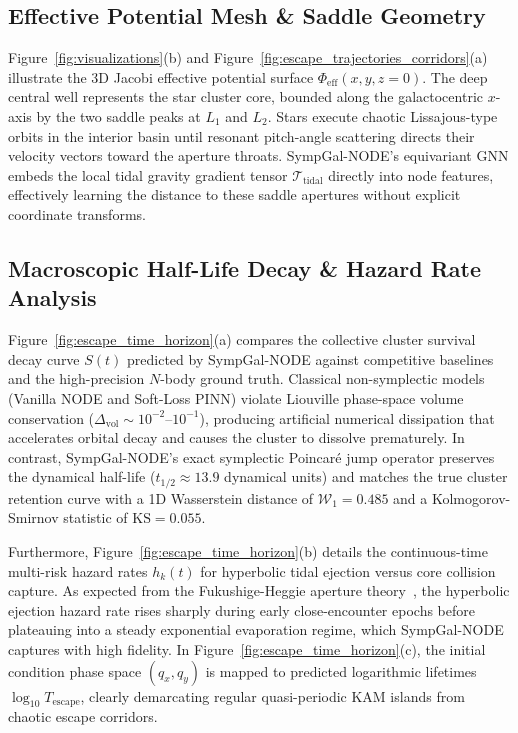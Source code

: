 \documentclass[preprint,12pt,3p]{elsarticle}
\begin{document}
\subsection{Effective Potential Mesh \& Saddle Geometry}
Figure~\ref{fig:visualizations}(b) and Figure~\ref{fig:escape_trajectories_corridors}(a) illustrate the 3D Jacobi effective potential surface $\Phi_{\mathrm{eff}}(x, y, z=0)$. The deep central well represents the star cluster core, bounded along the galactocentric $x$-axis by the two saddle peaks at $L_1$ and $L_2$. Stars execute chaotic Lissajous-type orbits in the interior basin until resonant pitch-angle scattering directs their velocity vectors toward the aperture throats. SympGal-NODE's equivariant GNN embeds the local tidal gravity gradient tensor $\bm{\mathcal{T}}_{\mathrm{tidal}}$ directly into node features, effectively learning the distance to these saddle apertures without explicit coordinate transforms.

\subsection{Macroscopic Half-Life Decay \& Hazard Rate Analysis}
Figure~\ref{fig:escape_time_horizon}(a) compares the collective cluster survival decay curve $S(t)$ predicted by SympGal-NODE against competitive baselines and the high-precision $N$-body ground truth. Classical non-symplectic models (Vanilla NODE and Soft-Loss PINN) violate Liouville phase-space volume conservation ($\Delta_{\mathrm{vol}} \sim 10^{-2}$--$10^{-1}$), producing artificial numerical dissipation that accelerates orbital decay and causes the cluster to dissolve prematurely. In contrast, SympGal-NODE's exact symplectic Poincaré jump operator preserves the dynamical half-life ($t_{1/2} \approx 13.9$ dynamical units) and matches the true cluster retention curve with a 1D Wasserstein distance of $\mathcal{W}_1 = 0.485$ and a Kolmogorov-Smirnov statistic of $\mathrm{KS} = 0.055$. 

Furthermore, Figure~\ref{fig:escape_time_horizon}(b) details the continuous-time multi-risk hazard rates $h_k(t)$ for hyperbolic tidal ejection versus core collision capture. As expected from the Fukushige-Heggie aperture theory~\cite{fukushige2000timescale}, the hyperbolic ejection hazard rate rises sharply during early close-encounter epochs before plateauing into a steady exponential evaporation regime, which SympGal-NODE captures with high fidelity. In Figure~\ref{fig:escape_time_horizon}(c), the initial condition phase space $(q_x, q_y)$ is mapped to predicted logarithmic lifetimes $\log_{10} T_{\mathrm{escape}}$, clearly demarcating regular quasi-periodic KAM islands from chaotic escape corridors.
\end{document}
